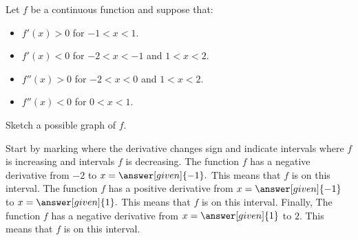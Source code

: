 \documentclass{ximera}
\begin{document}
\begin{example}
  Let $f$ be a continuous function and suppose that:
  \begin{itemize}
  \item $f'(x) > 0$ for $-1< x<1$.
  \item $f'(x) < 0$ for $-2< x<-1$ and $1<x<2$.
  \item $f''(x) > 0$ for $-2<x<0$ and $1<x< 2$.
  \item $f''(x) < 0$ for $0<x< 1$.  
  \end{itemize}
  Sketch a possible graph of $f$.
  \begin{explanation}
    Start by marking where the derivative changes sign and indicate
    intervals where $f$ is increasing and intervals $f$ is
    decreasing. The function $f$ has a negative derivative from $-2$
    to $x=\answer[given]{-1}.$ This means that $f$ is
     on
    this interval. The function $f$ has a positive derivative from
    $x=\answer[given]{-1}$ to $x=\answer[given]{1}.$ This means that
    $f$ is
     on
    this interval. Finally, The function $f$ has a negative derivative
    from $x=\answer[given]{1}$ to $2$. This means that $f$ is
     on
    this interval.
  \begin{image}
\end{image}
\end{explanation}
\end{example}
\end{document}
